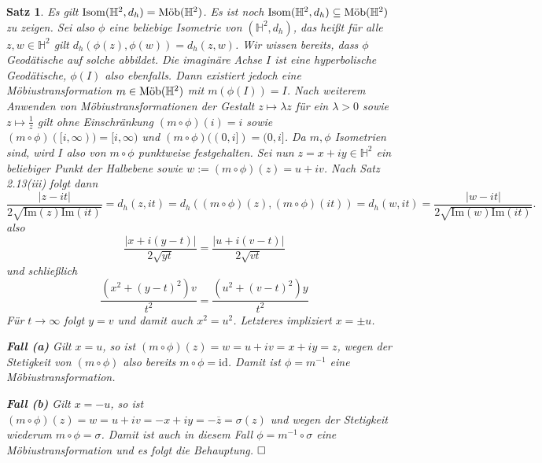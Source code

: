 \documentclass[11pt]{book}
\numberwithin{dummy}{section}
\newtheorem{theorem}{Satz}[section]
\theoremstyle{nonumberbreak}
\newenvironment{pr}[1][]{\ifthenelse{\equal{#1}{}}{\proof}{\proof[#1]}\rm}{\endproof}
\newcommand{\He}{\mathbb{H}}
\newcommand{\id}{\mathrm{id}}
\newcommand{\amob}{\textup{Möb}}
\begin{document}
\begin{spacing}{1.4}
\hypertarget{satzzweifuenfeins}{}
\begin{theorem}    %
Es gilt $\mathrm{Isom}(\He^2, d_h) = \amob(\He^2)$.
\begin{pr}
Es ist noch $\mathrm{Isom}(\He^2, d_h) \subseteq \amob(\He^2)$ zu zeigen. Sei also $\phi$ eine beliebige Isometrie von $(\He^2, d_h)$, das heißt für alle $z,w \in \He^2$ gilt $d_h(\phi(z), \phi(w)) = d_h(z,w)$. Wir wissen bereits, dass $\phi$ Geodätische auf solche abbildet. Die imaginäre Achse $I$ ist eine hyperbolische Geodätische, $\phi(I)$ also ebenfalls. Dann existiert jedoch eine Möbiustransformation $m \in \amob(\He^2)$ mit $m(\phi(I)) = I$. Nach weiterem Anwenden von Möbiustransformationen der Gestalt $z\mapsto \lambda z$ für ein $\lambda>0$ sowie $z \mapsto \frac{1}{z}$ gilt ohne Einschränkung $(m\circ\phi)(i) = i$ sowie $(m\circ \phi)([i,\infty))=[i,\infty)$ und $(m \circ \phi)((0,i]) = (0,i]$. Da $m, \phi$ Isometrien sind, wird $I$ also von $m \circ \phi$ punktweise festgehalten. Sei nun $z=x+iy \in \mathbb{H}^2$ ein beliebiger Punkt der Halbebene sowie $w:=(m \circ \phi)(z) = u + i v$. Nach Satz 2.13(iii) folgt dann 
$$\frac{\vert z - it\vert}{2 \sqrt{ \mathrm{Im}(z) \mathrm{Im}(it)}} = d_h(z,it) = d_h((m\circ \phi)(z), (m\circ \phi)(it)) = d_h(w,it) = \frac{\vert w - it\vert}{2 \sqrt{\mathrm{Im}(w) \mathrm{Im}(it)}}.$$
also 
$$\frac{\vert x + i(y-t) \vert}{2 \sqrt{yt}} = \frac{ \vert u + i(v-t)\vert}{2 \sqrt{vt}}$$
und schließlich
$$\frac{(x^2+(y-t)^2)v}{t^2} = \frac{(u^2+(v-t)^2)y}{t^2}$$
Für $t \to \infty$ folgt $y=v$ und damit auch $x^2=u^2$. Letzteres impliziert $x=\pm u$.
\begin{compactenum}
\item[\textbf{Fall (a)}] Gilt $x=u$, so ist $(m \circ \phi)(z) = w = u+iv = x+iy = z$, wegen der Stetigkeit von $(m \circ \phi)$ also bereits $m \circ \phi = \id$. Damit ist $\phi = m^{-1}$ eine Möbiustransformation.
\item[\textbf{Fall (b)}] Gilt $x=-u$, so ist $(m \circ \phi)(z) = w = u+iv = -x+iy = -\overline{z} = \sigma(z)$ und wegen der Stetigkeit wiederum $m \circ \phi = \sigma$. Damit ist auch in diesem Fall $\phi = m^{-1} \circ \sigma$ eine Möbiustransformation und es folgt die Behauptung. $\hfill \Box$
\end{compactenum}



\end{pr}
\end{theorem}








\end{spacing}
\end{document}
